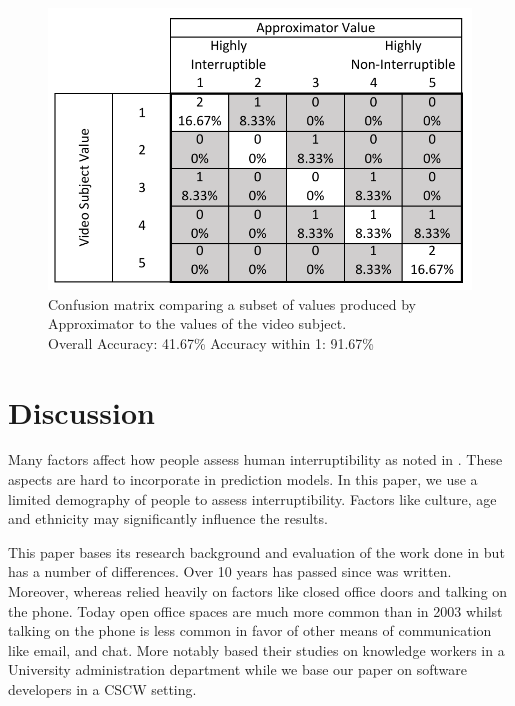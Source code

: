 \documentclass{sigchi}
\begin{document}
\begin{figure}[h]
  \centering
  \includegraphics[width=\columnwidth]{figures/VideoToApproximatorConfusionMatrix(AndersValues).pdf}
  \caption{Confusion matrix comparing a subset of values produced by Approximator to the values of the video subject. \\Overall Accuracy: 41.67\% Accuracy within 1: 91.67\%}
  \label{fig:subset_video_to_approximator_matrix}
\end{figure}

\section{Discussion}
Many factors affect how people assess human interruptibility as noted in \cite{Avrahami2007}.
These aspects are hard to incorporate in prediction models.
In this paper, we use a limited demography of people to assess interruptibility.
Factors like culture, age and ethnicity may significantly influence the results.

This paper bases its research background and evaluation of the work done in \cite{fogarty2005predicting} but has a number of differences.
Over 10 years has passed since \cite{fogarty2005predicting} was written.
Moreover, whereas \cite{fogarty2005predicting} relied heavily on factors like closed office doors and talking on the phone.
Today open office spaces are much more common than in 2003 whilst talking on the phone is less common in favor of other means of communication like email, and chat.
More notably \cite{fogarty2005predicting} based their studies on knowledge workers in a University administration department while we base our paper on software developers in a CSCW setting.
\end{document}
